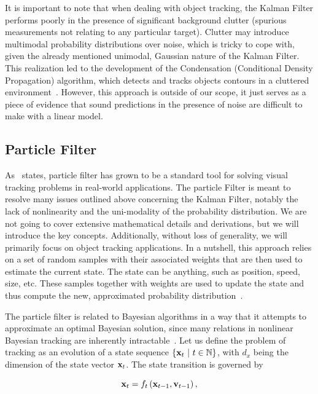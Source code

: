 It is important to note that when dealing with object tracking, the Kalman Filter performs poorly in the presence of significant background clutter (spurious measurements not relating to any particular target). Clutter may introduce multimodal probability distributions over noise, which is tricky to cope with, given the already mentioned unimodal, Gaussian nature of the Kalman Filter. This realization led to the development of the Condensation (Conditional Density Propagation) algorithm, which detects and tracks objects contours in a cluttered environment~\cite{isard1998condensation}. However, this approach is outside of our scope, it just serves as a piece of evidence that sound predictions in the presence of noise are difficult to make with a linear model.

\subsection{Particle Filter}
\label{ssec:ParticleFilter}

As~\cite{particle_filters_for_vot} states, particle filter has grown to be a standard tool for solving visual tracking problems in real-world applications. The particle Filter is meant to resolve many issues outlined above concerning the Kalman Filter, notably the lack of nonlinearity and the uni-modality of the probability distribution. We are not going to cover extensive mathematical details and derivations, but we will introduce the key concepts. Additionally, without loss of generality, we will primarily focus on object tracking applications. In a nutshell, this approach relies on a set of random samples with their associated weights that are then used to estimate the current state. The state can be anything, such as position, speed, size, etc. These samples together with weights are used to update the state and thus compute the new, approximated probability distribution~\cite{welch1995introduction}.

The particle filter is related to Bayesian algorithms in a way that it attempts to approximate an optimal Bayesian solution, since many relations in nonlinear Bayesian tracking are inherently intractable~\cite{Arulampalam2007}. Let us define the problem of tracking as an evolution of a state sequence $\left\{ {\mathbf{x}_t \ | \ t \in \mathbb{N}} \right\}$, with $d_x$ being the dimension of the state vector $\mathbf{x}_t$. The state transition is governed by

\begin{equation}
    \label{eq:ProbModelStateEvolution}
    \mathbf{x}_t = {f_t} \left( \mathbf{x}_{t - 1}, \mathbf{v}_{t - 1} \right),
\end{equation}

